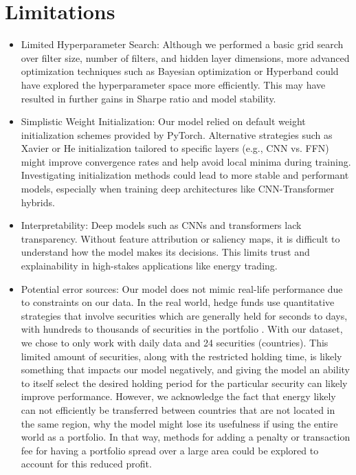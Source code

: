 \documentclass[12pt]{article}
\begin{document}
\section{Limitations}
\begin{itemize}
\item Limited Hyperparameter Search: Although we performed a basic grid search over filter size, number of filters, and hidden layer dimensions, more advanced optimization techniques such as Bayesian optimization or Hyperband could have explored the hyperparameter space more efficiently. This may have resulted in further gains in Sharpe ratio and model stability.

\item Simplistic Weight Initialization: Our model relied on default weight initialization schemes provided by PyTorch. Alternative strategies such as Xavier or He initialization tailored to specific layers (e.g., CNN vs. FFN) might improve convergence rates and help avoid local minima during training. Investigating initialization methods could lead to more stable and performant models, especially when training deep architectures like CNN-Transformer hybrids.

\item Interpretability: Deep models such as CNNs and transformers lack transparency. Without feature attribution or saliency maps, it is difficult to understand how the model makes its decisions. This limits trust and explainability in high-stakes applications like energy trading.

\item Potential error sources: Our model does not mimic real-life performance due to constraints on our data. In the real world, hedge funds use quantitative strategies that involve securities which are generally held for seconds to days, with hundreds to thousands of securities in the portfolio \citep{Lo2010}. With our dataset, we chose to only work with daily data and 24 securities (countries). This limited amount of securities, along with the restricted holding time, is likely something that impacts our model negatively, and giving the model an ability to itself select the desired holding period for the particular security can likely improve performance. However, we acknowledge the fact that energy likely can not efficiently be transferred between countries that are not located in the same region, why the model might lose its usefulness if using the entire world as a portfolio. In that way, methods for adding a penalty or transaction fee for having a portfolio spread over a large area could be explored to account for this reduced profit.

\end{itemize}
\clearpage
\end{document}
